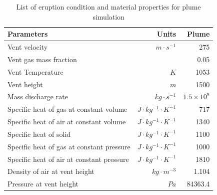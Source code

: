 \documentclass[utf8]{frontiersSCNS} %
\begin{document}
\begin{table}[htp]
	\centering
\caption{List of eruption condition and material properties for plume simulation}		
	 \begin{tabular}{lrr}
	 \hline
	 Parameters & Units & Plume \\
	 \hline
	 Vent velocity & $m\cdot s^{-1}$ & 275 \\
	 Vent gas mass fraction & & 0.05 \\
	 Vent Temperature & $K$ & 1053 \\
	 Vent height & $m$ & 1500 \\
	 Mass discharge rate & $kg\cdot s^{-1}$ & $1.5 \times 10^9$\\
	 	Specific heat of gas at constant volume & $J \cdot kg^{-1}\cdot K^{-1}$ & 717 \\
	 Specific heat of air at constant volume & $J \cdot kg^{-1}\cdot K^{-1}$ & 1340 \\
	 	Specific heat of solid & $J \cdot kg^{-1}\cdot K^{-1}$ & 1100 \\
	 	Specific heat of gas at constant pressure & $J \cdot kg^{-1}\cdot K^{-1}$ & 1000 \\
	 	Specific heat of air at constant pressure & $J \cdot kg^{-1}\cdot K^{-1}$ & 1810 \\
	 	Density of air at vent height & $kg \cdot m^{-3}$ & 1.104 \\
	 Pressure at vent height & $Pa$ & 84363.4 \\
	 \hline
	 \end{tabular}
	 \label{tab:input_parameters_plume_simulation}
\end{table}
\end{document}
